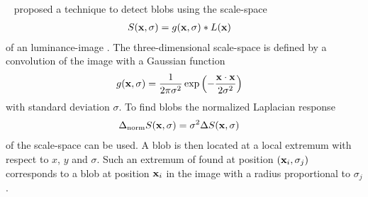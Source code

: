 ~\cite{Lindeberg1998} proposed a technique to detect blobs using the scale\hyp{}space
\begin{align}
	\label{eq:scalespace}
	S (\mathbf{x}, \sigma) &= g(\mathbf{x}, \sigma) * L (\mathbf{x}) 
\end{align} of an luminance-image \luminance. 
The three-dimensional scale\hyp{}space is defined by a convolution of the image with a Gaussian function 
\begin{align}
	\label{eq:gaussian}
	g(\mathbf{x}, \sigma) &= \frac{1}{2 \pi \sigma^2} \exp\left( -\frac{\mathbf{x} \cdot \mathbf{x}}{2 \sigma^2} \right) 
\end{align}
with standard deviation $\sigma$.
To find blobs the normalized Laplacian response 
\begin{align}
	\label{eq:normlaplace}
	\normlaplacescalespace (\vector{x}, \sigma) &= \sigma^2 \laplace \scalespace(\vector{x}, \sigma) %
\end{align}
of the scale\hyp{}space can be used.
A blob is then located at a local extremum with respect to $x$, $y$ and $\sigma$.
Such an extremum of \normlaplacescalespace{} found at position $(\mathbf{x}_i, \sigma_j)$ corresponds to a blob at position $\mathbf{x}_i$ in the image with a radius proportional to $\sigma_j$.

